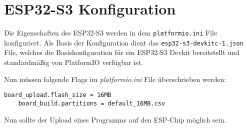     \section{ESP32-S3 Konfiguration}
    Die Eigenschaften des ESP32-S3 werden in dem \lstinline{platformio.ini}
    File konfiguriert. Als Basis der Konfiguration dient
    das \lstinline{esp32-s3-devkitc-1.json} File, welches die
    Basiskonfiguration für ein ESP32-S3 Devkit bereitstellt
    und standardmäßig von PlatformIO verfügbar ist. \par
    
    Nun müssen folgende Flags im \textit{platformio.ini} File
    überschrieben werden:

    \begin{lstlisting}[style=cppCode]
    board_upload.flash_size = 16MB
    board_build.partitions = default_16MB.csv
    \end{lstlisting}

    Nun sollte der Upload eines Programms auf den 
    ESP-Chip möglich sein.

    
    




